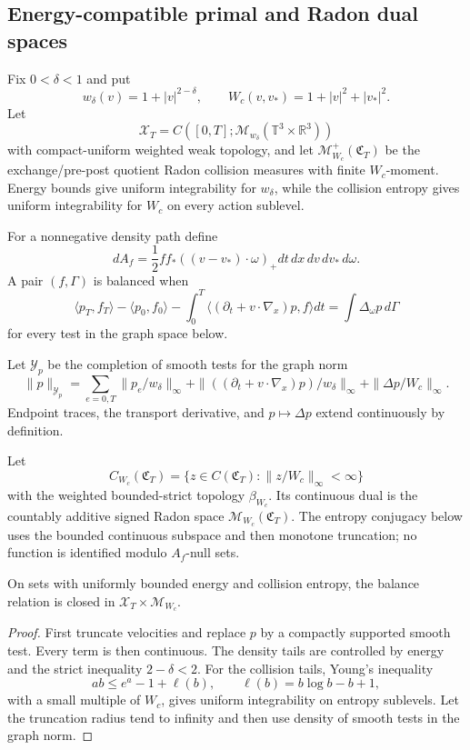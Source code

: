 \subsection{Energy-compatible primal and Radon dual spaces}

Fix \(0<\delta<1\) and put
\[
 w_\delta(v)=1+|v|^{2-\delta},
 \qquad
 W_c(v,v_*)=1+|v|^2+|v_*|^2.
\]
Let
\[
 \mathcal X_T=C([0,T];\mathcal M_{w_\delta}
 (\mathbb T^3\times\mathbb R^3))
\]
with compact-uniform weighted weak topology, and let
\(\mathcal M_{W_c}^+(\mathfrak C_T)\) be the exchange/pre-post quotient
Radon collision measures with finite \(W_c\)-moment.  Energy bounds give
uniform integrability for \(w_\delta\), while the collision entropy gives
uniform integrability for \(W_c\) on every action sublevel.

For a nonnegative density path define
\[
 dA_f=\frac12ff_*((v-v_*)\cdot\omega)_+
 dt\,dx\,dv\,dv_*\,d\omega.
\]
A pair \((f,\Gamma)\) is balanced when
\[
 \langle p_T,f_T\rangle-\langle p_0,f_0\rangle
 -\int_0^T\langle(\partial_t+v\cdot\nabla_x)p,f\rangle dt
 =\int\Delta_\omega p\,d\Gamma
\]
for every test in the graph space below.

Let \(\mathcal Y_p\) be the completion of smooth tests for the graph norm
\[
 \|p\|_{\mathcal Y_p}
 =\sum_{e=0,T}\|p_e/w_\delta\|_\infty
 +\|((\partial_t+v\cdot\nabla_x)p)/w_\delta\|_\infty
 +\|\Delta p/W_c\|_\infty.
\]
Endpoint traces, the transport derivative, and
\(p\mapsto\Delta p\) extend continuously by definition.

Let
\[
 C_{W_c}(\mathfrak C_T)
 =\{z\in C(\mathfrak C_T):\|z/W_c\|_\infty<\infty\}
\]
with the weighted bounded-strict topology \(\beta_{W_c}\).  Its continuous
dual is the countably additive signed Radon space
\(\mathcal M_{W_c}(\mathfrak C_T)\).  The entropy conjugacy below uses the
bounded continuous subspace and then monotone truncation; no function is
identified modulo \(A_f\)-null sets.

\begin{lemma}
\label{lem:r3-b3-balance-closed}
On sets with uniformly bounded energy and collision entropy, the balance
relation is closed in
\(\mathcal X_T\times\mathcal M_{W_c}\).
\end{lemma}

\begin{proof}
First truncate velocities and replace \(p\) by a compactly supported smooth
test.  Every term is then continuous.  The density tails are controlled by
energy and the strict inequality \(2-\delta<2\).  For the collision tails,
Young's inequality
\[
 ab\le e^a-1+\ell(b),\qquad \ell(b)=b\log b-b+1,
\]
with a small multiple of \(W_c\), gives uniform integrability on entropy
sublevels.  Let the truncation radius tend to infinity and then use density of
smooth tests in the graph norm.
\end{proof}

